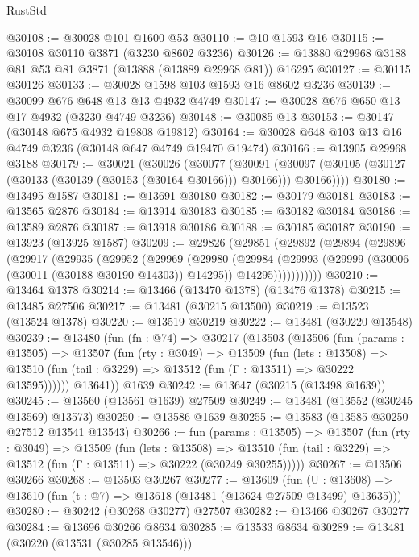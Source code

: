 \begin{lexlean}{RustStd}
\begin{coremodule}
@30108 := @30028 @101 @1600 @53
@30110 := @10 @1593 @16
@30115 := @30108 @30110 @3871 (@3230 @8602 @3236)
@30126 := @13880 @29968 @3188 @81 @53 @81 @3871 (@13888 (@13889 @29968 @81)) @16295
@30127 := @30115 @30126
@30133 := @30028 @1598 @103 @1593 @16 @8602 @3236
@30139 := @30099 @676 @648 @13 @13 @4932 @4749
@30147 := @30028 @676 @650 @13 @17 @4932 (@3230 @4749 @3236)
@30148 := @30085 @13
@30153 := @30147 (@30148 @675 @4932 @19808 @19812)
@30164 := @30028 @648 @103 @13 @16 @4749 @3236 (@30148 @647 @4749 @19470 @19474)
@30166 := @13905 @29968 @3188
@30179 := @30021
    (@30026
      (@30077
        (@30091
          (@30097 (@30105 (@30127 (@30133 (@30139 (@30153 (@30164 @30166))) @30166))) @30166))))
@30180 := @13495 @1587
@30181 := @13691 @30180
@30182 := @30179 @30181
@30183 := @13565 @2876
@30184 := @13914 @30183
@30185 := @30182 @30184
@30186 := @13589 @2876
@30187 := @13918 @30186
@30188 := @30185 @30187
@30190 := @13923 (@13925 @1587)
@30209 := @29826
    (@29851
      (@29892
        (@29894
          (@29896
            (@29917
              (@29935
                (@29952
                  (@29969
                    (@29980
                      (@29984
                        (@29993
                          (@29999 (@30006 (@30011 (@30188 @30190 @14303)) @14295))
                          @14295)))))))))))
@30210 := @13464 @1378
@30214 := @13466 (@13470 @1378) (@13476 @1378)
@30215 := @13485 @27506
@30217 := @13481 (@30215 @13500)
@30219 := @13523 (@13524 @1378)
@30220 := @13519 @30219
@30222 := @13481 (@30220 @13548)
@30239 := @13480
    (fun (fn : @74) =>
    @30217
      (@13503
        (@13506
          (fun (params : @13505) =>
          @13507
            (fun (rty : @3049) =>
            @13509
              (fun (lets : @13508) =>
              @13510 (fun (tail : @3229) => @13512 (fun (Γ : @13511) => @30222 @13595))))))
        @13641))
    @1639
@30242 := @13647 (@30215 (@13498 @1639))
@30245 := @13560 (@13561 @1639) @27509
@30249 := @13481 (@13552 (@30245 @13569) @13573)
@30250 := @13586 @1639
@30255 := @13583 (@13585 @30250 @27512 @13541 @13543)
@30266 := fun (params : @13505) =>
  @13507
    (fun (rty : @3049) =>
    @13509
      (fun (lets : @13508) =>
      @13510 (fun (tail : @3229) => @13512 (fun (Γ : @13511) => @30222 (@30249 @30255)))))
@30267 := @13506 @30266
@30268 := @13503 @30267
@30277 := @13609
    (fun (U : @13608) => @13610 (fun (t : @7) => @13618 (@13481 (@13624 @27509 @13499) @13635)))
@30280 := @30242 (@30268 @30277) @27507
@30282 := @13466 @30267 @30277
@30284 := @13696 @30266 @8634
@30285 := @13533 @8634
@30289 := @13481 (@30220 (@13531 (@30285 @13546)))

\end{coremodule}
\end{lexlean}
